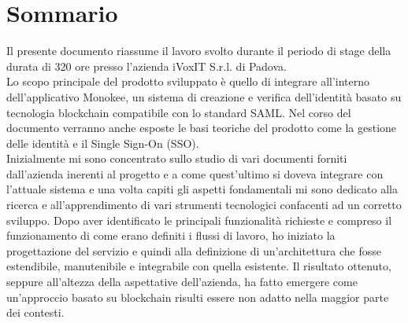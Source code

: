 
\cleardoublepage
{}
{}
\begingroup
\let\clearpage\relax
\let\cleardoublepage\relax
\let\cleardoublepage\relax

\chapter*{Sommario}

Il presente documento riassume il lavoro svolto durante il periodo di stage della durata
di 320 ore presso l’azienda iVoxIT S.r.l. di Padova.\\
Lo scopo principale del prodotto sviluppato è quello di integrare all'interno dell'applicativo Monokee, un sistema di creazione e verifica dell'identità basato su tecnologia blockchain compatibile con lo standard SAML. 
Nel corso del documento verranno anche esposte le basi teoriche del prodotto come la gestione delle identità e il Single Sign-On (SSO).\\
Inizialmente mi sono concentrato sullo studio di vari documenti forniti dall'azienda inerenti al progetto e a come quest'ultimo si doveva integrare con l'attuale sistema e
una volta capiti gli aspetti fondamentali mi sono dedicato alla ricerca e all'apprendimento di vari strumenti tecnologici
confacenti ad un corretto sviluppo.                 
Dopo aver identificato le principali funzionalità richieste e compreso il funzionamento di come erano definiti i flussi di lavoro, ho iniziato la progettazione del servizio e                                                   quindi alla definizione di
un’architettura che fosse estendibile, manutenibile e integrabile con quella esistente. Il risultato ottenuto, seppure all’altezza della aspettative dell’azienda, ha fatto emergere come un'approccio basato su blockchain risulti essere non adatto nella maggior parte dei contesti.


%
%

\endgroup			

\vfill


